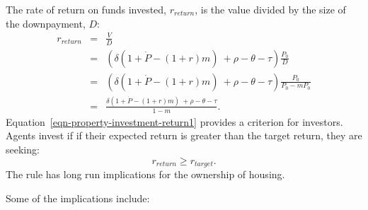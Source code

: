 The rate of return on funds invested, $r_{return}$, is the value divided by the size of the downpayment, $D$: 
\begin{eqnarray}
r_{return} 
  &=& \frac{V}{D}  \nonumber \\
  &=& \left(\delta \left(1+\dot P - (1+r)m\right) \ + \rho - \theta - \tau \right) \frac{P_0}{D}        \nonumber \\
  &=& \left(\delta \left(1+\dot P - (1+r)m\right) \ + \rho - \theta - \tau \right) \frac{P_0}{P_0-mP_0} \nonumber \\ 
  &=& \frac{\delta \left(1+\dot P - (1+r)m\right) \ + \rho - \theta - \tau }{1-m}.
\label{eqn-property-investment-return1}
\end{eqnarray}
Equation~\ref{eqn-property-investment-return1} provides a criterion for investors. Agents invest if if their expected return is greater than the target return, they are seeking:
\begin{equation}
r_{return} \geq r_{target}. \label{eqn-property-investment-return2}
\end{equation}
The rule has long run implications for the ownership of housing. 

Some of the implications include:

